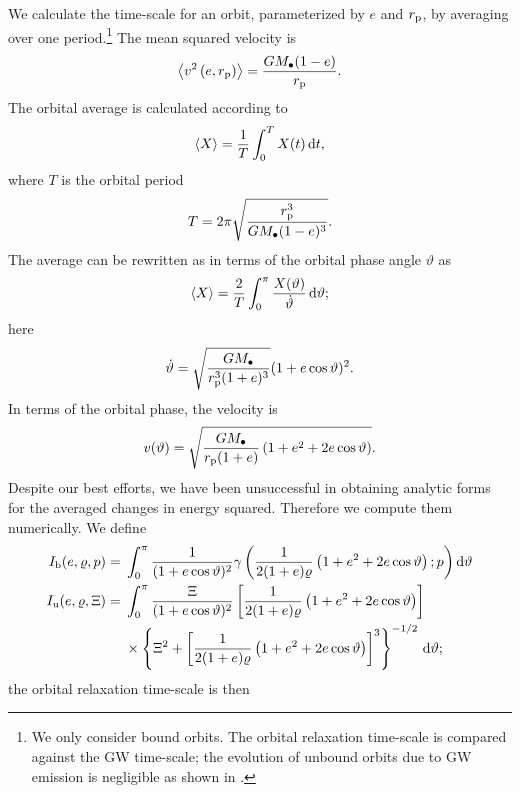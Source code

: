 We calculate the time-scale for an orbit, parameterized by $e$ and $r_\mathrm{p}$, by averaging over one period.\footnote{We only consider bound orbits. The orbital relaxation time-scale is compared against the GW time-scale; the evolution of unbound orbits due to GW emission is negligible as shown in .} The mean squared velocity is
\begin{equation}
\left\langle v^2\left(e,r_\mathrm{p}\right)\right\rangle = \dfrac{GM_\bullet(1 - e)}{r_\mathrm{p}}.
\end{equation}
The orbital average is calculated according to \citep[section 2.2b]{Spitzer1987}
\begin{equation}
\left\langle X\right\rangle = \dfrac{1}{T}\int_{0}^{T}{X(t)}\,\mathrm{d}{t},
\end{equation}
where $T$ is the orbital period
\begin{equation}
T = 2\pi\sqrt{\dfrac{r_\mathrm{p}^3}{GM_\bullet(1-e)^{3}}}.
\end{equation}
The average can be rewritten as in terms of the orbital phase angle $\vartheta$ as
\begin{equation}
\left\langle X\right\rangle = \dfrac{2}{T}\int_{0}^{\pi}{\dfrac{X(\vartheta)}{\dot{\vartheta}}}\,\mathrm{d}{\vartheta};
\end{equation}
here
\begin{equation}
\dot{\vartheta} = \sqrt{\dfrac{GM_\bullet}{r_\mathrm{p}^3(1+e)^3}}(1 + e \cos\vartheta)^2.
\end{equation}
In terms of the orbital phase, the velocity is
\begin{equation}
v(\vartheta) = \sqrt{\dfrac{GM_\bullet}{r_\mathrm{p}(1+e)}\left(1 + e^2 + 2e\cos\vartheta\right)}.
\end{equation}
Despite our best efforts, we have been unsuccessful in obtaining analytic forms for the averaged changes in energy squared. Therefore we compute them numerically. We define
\begin{align}
I_\mathrm{b}(e,\varrho,p) = {} & \int_{0}^{\pi}{\dfrac{1}{(1 + e \cos\vartheta)^2}\gamma\left(\dfrac{1}{2(1+e)\varrho}\left(1+e^2+2e\cos\vartheta\right);p\right)}\,\mathrm{d}{\vartheta} \\
I_\mathrm{u}(e,\varrho,\Xi) = {} & \int_{0}^{\pi} \dfrac{\Xi}{(1 + e \cos\vartheta)^2}\left[\dfrac{1}{2(1+e)\varrho}\left(1+e^2+2e\cos\vartheta\right)\right] \nonumber \\*
 {} & \times \left\{\Xi^2 + \left[\dfrac{1}{2(1+e)\varrho}\left(1+e^2+2e\cos\vartheta\right)\right]^3\right\}^{-1/2} \,\mathrm{d}\vartheta;
\end{align}
the orbital relaxation time-scale is then
